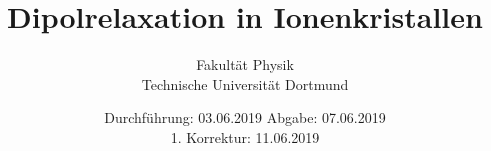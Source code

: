 

\subject{VERSUCH NUMMER 48}
\title{Dipolrelaxation in Ionenkristallen}
\date{
  Durchführung: 03.06.2019
  \hspace{3em}
  Abgabe: 07.06.2019 \\
  \vspace{0.5cm}
  1. Korrektur: 11.06.2019
}
\subtitle{\centering Fakultät Physik \\
Technische Universität Dortmund}


\thispagestyle{empty}
\maketitle
\thispagestyle{empty}
\tableofcontents
\newpage
\setcounter{page}{1}


% 




\nocite{*}
\printbibliography

